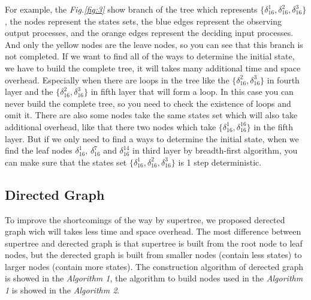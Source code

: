 \documentclass[conference]{IEEEtran} %
\begin{document}
For example, the {\em Fig.\ref{fig:3}} show branch of the tree which represents $\{\delta_{16}^1,\delta_{16}^2,\delta_{16}^3\}$, the nodes represent the states sets, the blue edges represent the observing output processes, and the orange edges represent the deciding input processes. And only the yellow nodes are the leave nodes, so you can see that this branch is not completed. If we want to find all of the ways to determine the initial state, we have to build the complete tree, it will takes many additional time and space overhead. Especially when there are loops in the tree like the $\{\delta_{16}^2,\delta_{16}^3\}$ in fourth layer and the $\{\delta_{16}^2,\delta_{16}^3\}$ in fifth layer that will form a loop. In this case you can never build the complete tree, so you need to check the existence of loops and omit it. There are also some nodes take the same states set which will also take additional overhead, like that there two nodes which take $\{\delta_{16}^1,\delta_{16}^{16}\}$ in the fifth layer. But if we only need to find a ways to determine the initial state, when we find the leaf nodes $\delta_{16}^1$, $\delta_{16}^7$ and  $\delta_{16}^{14}$ in third layer by breadth-first algorithm, you can make sure that the states set $\{\delta_{16}^1,\delta_{16}^2,\delta_{16}^3\}$ is 1 step deterministic.  
\subsection{Directed Graph}
To improve the shortcomings of the way by supertree, we proposed derected graph wich will takes less time and space overhead. The most difference between supertree and derected graph is that supertree is built from the root node to leaf nodes, but the derected graph is built from smaller nodes (contain less states) to larger nodes (contain more states). The construction algorithm of derected graph is showed in the {\em Algorithm 1}, the algorithm to build nodes used in the {\em Algorithm 1} is showed in the {\em Algorithm 2}.
\end{document}

